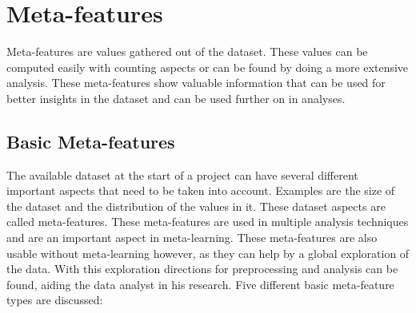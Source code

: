 \documentclass[10pt,a4paper]{article}
\begin{document}
	
	 
	
	
	\appendix
	
	\section{Meta-features}
	\label{app:MetaFeatures}
	
	Meta-features are values gathered out of the dataset. These values can be computed easily with counting aspects or can be found by doing a more extensive analysis. These meta-features show valuable information that can be used for better insights in the dataset and can be used further on in analyses.
	
	\subsection{Basic Meta-features}
	\label{subsec:BasicMF}
	
	The available dataset at the start of a project can have several different important aspects that need to be taken into account. Examples are the size of the dataset and the distribution of the values in it. These dataset aspects are called meta-features\cite{kluegl2009meta}. These meta-features are used in multiple analysis techniques and are an important aspect in meta-learning\cite{kluegl2009meta, castiello2005meta, vilalta2002perspective, bourbakis2011extracting}. These meta-features are also usable without meta-learning however, as they can help by a global exploration of the data. With this exploration directions for preprocessing and analysis can be found, aiding the data analyst in his research. Five different basic meta-feature types are discussed:
	
\end{document}
